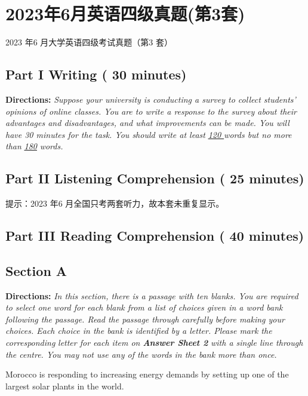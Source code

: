 \documentclass[UTF8,11pt]{ctexart}
\begin{document}
\section*{2023年6月英语四级真题(第3套)}
2023 年6 月大学英语四级考试真题（第3 套）


\subsection*{\textbf{Part I Writing} \textbf{( 30 minutes)}}


\textbf{Directions:}\textit{ Suppose your university is conducting a survey to collect students’ opinions of online classes. You} \textit{are to write a response to the survey about their advantages and disadvantages, and what improvements can} \textit{be made. You will have 30 minutes for the task. You should write at least }\textit{\uline{120 }}\textit{words but no more than }\textit{\uline{180}} \textit{words.}


\subsection*{\textbf{Part II} \textbf{Listening Comprehension} \textbf{( 25 minutes)}}


提示：2023 年6 月全国只考两套听力，故本套未重复显示。


\subsection*{\textbf{Part III Reading Comprehension ( 40 minutes)}}


\subsection*{\textbf{Section A}}


\textbf{Directions:} \textit{In this section, there is a passage with ten blanks. You are required to select one word for each} \textit{blank from a list of choices given in a word bank following the passage. Read the passage through carefully} \textit{before making your choices. Each choice in the bank is identified by a letter. Please mark the corresponding} \textit{letter for each item on }\textbf{\textit{Answer Sheet 2}}\textit{ with a single line through the centre. You may not use any of the words} \textit{in the bank more than once.}


Morocco is responding to increasing energy demands by setting up one of the largest solar plants in the world.
\end{document}

